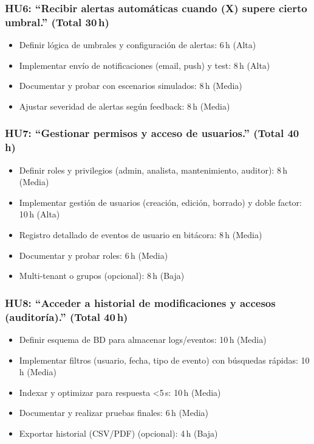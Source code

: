 \documentclass[
11pt, %
]{ProyectoVpC}
\begin{document}
\subsubsection*{HU6: “Recibir alertas automáticas cuando (X) supere cierto umbral.” (Total 30\,h)}

\begin{itemize}
  \item Definir lógica de umbrales y configuración de alertas: 6\,h (Alta)
  \item Implementar envío de notificaciones (email, push) y test: 8\,h (Alta)
  \item Documentar y probar con escenarios simulados: 8\,h (Media)
  \item Ajustar severidad de alertas según feedback: 8\,h (Media)
\end{itemize}

\subsubsection*{HU7: “Gestionar permisos y acceso de usuarios.” (Total 40\,h)}

\begin{itemize}
  \item Definir roles y privilegios (admin, analista, mantenimiento, auditor): 8\,h (Media)
  \item Implementar gestión de usuarios (creación, edición, borrado) y doble factor: 10\,h (Alta)
  \item Registro detallado de eventos de usuario en bitácora: 8\,h (Media)
  \item Documentar y probar roles: 6\,h (Media)
  \item Multi-tenant o grupos (opcional): 8\,h (Baja)
\end{itemize}

\subsubsection*{HU8: “Acceder a historial de modificaciones y accesos (auditoría).” (Total 40\,h)}

\begin{itemize}
  \item Definir esquema de BD para almacenar logs/eventos: 10\,h (Media)
  \item Implementar filtros (usuario, fecha, tipo de evento) con búsquedas rápidas: 10\,h (Media)
  \item Indexar y optimizar para respuesta \textless5\,s: 10\,h (Media)
  \item Documentar y realizar pruebas finales: 6\,h (Media)
  \item Exportar historial (CSV/PDF) (opcional): 4\,h (Baja)
\end{itemize}
\end{document}
